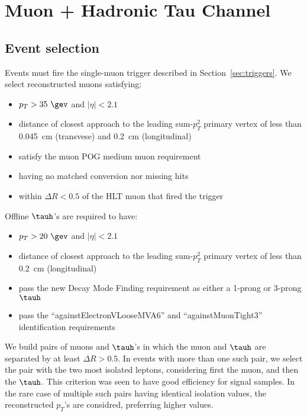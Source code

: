 \section{Muon + Hadronic Tau Channel}\label{sec:mTauhad}

\subsection{Event selection}\label{sec:mt_selection}

Events must fire the single-muon trigger described in
Section~\ref{sec:triggers}.  We select reconstructed muons
satisfying:
\begin{itemize}
  \item $p_T>35~\gev$ and $\vert\eta\vert<2.1$
  \item distance of closest approach to the leading 
sum-$p_T^2$ primary vertex of less than 0.045~cm 
(transvese) and 0.2~cm (longitudinal)
  \item satisfy the muon POG medium muon requirement
  \item having no matched conversion nor missing hits
  \item within $\Delta R<0.5$ of the HLT muon that fired the trigger

\end{itemize}

Offline $\tauh$'s are required to have:
\begin{itemize}
  \item $p_{T}> 20~\gev$ and $\vert \eta \vert < 2.1$
  \item distance of closest approach to the leading
sum-$p_T^2$ primary vertex of less than 0.2~cm (longitudinal)
  \item pass the new Decay Mode Finding requirement as 
either a 1-prong or 3-prong $\tauh$
  \item pass the ``againstElectronVLooseMVA6'' and
``againstMuonTight3'' identification requirements
\end{itemize}

We build pairs of muons and $\tauh$'s in which the muon and
$\tauh$ are separated by at least $\Delta R > 0.5$.  In events with
more than one such pair, we select the pair with the two most isolated
leptons, considering first the muon, and then the $\tauh$.  This
criterion was seen to have good efficiency for signal samples.  In the
rare case of multiple such pairs having identical isolation values,
the reconstructed $p_T$'s are considred, preferring higher values.

